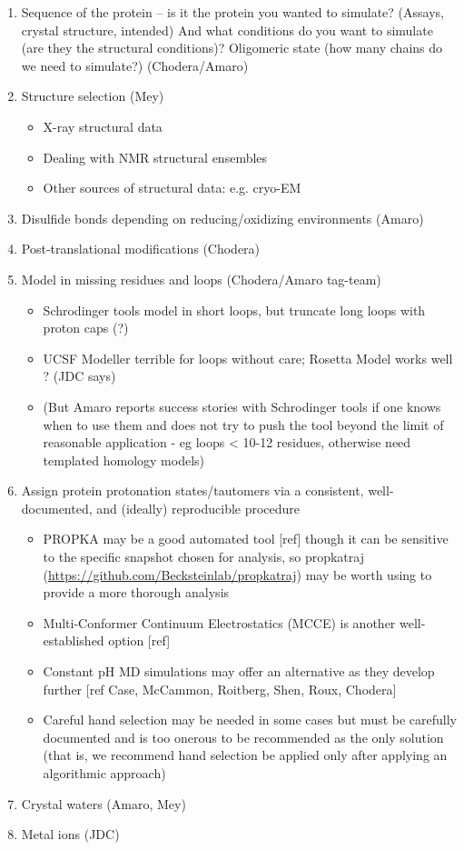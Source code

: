\documentclass[9pt,bestpractices]{livecoms}
\begin{document}
\begin{enumerate}
\item Sequence of the protein -- is it the protein you wanted to simulate? (Assays, crystal structure, intended) And what conditions do you want to simulate (are they the structural conditions)? Oligomeric state (how many chains do we need to simulate?) (Chodera/Amaro)
\item Structure selection (Mey) 
    \begin{itemize}
    \item  X-ray structural data
    \item Dealing with NMR structural ensembles
    \item Other sources of structural data: e.g. cryo-EM
    \end{itemize}
\item Disulfide bonds depending on reducing/oxidizing environments (Amaro)
\item Post-translational modifications (Chodera)
\item Model in missing residues and loops (Chodera/Amaro tag-team)
    \begin{itemize}
    \item Schrodinger tools model in short loops, but truncate long loops with proton caps (?)
    \item UCSF Modeller terrible for loops without care; Rosetta Model works well ? (JDC says)
    \item (But Amaro reports success stories with Schrodinger tools if one knows when to use them and does not try to push the tool beyond the limit of reasonable application - eg loops < 10-12 residues, otherwise need templated homology models)
    \end{itemize}
\item Assign protein protonation states/tautomers via a consistent, well-documented, and (ideally) reproducible procedure 
    \begin{itemize}
    \item PROPKA may be a good automated tool [ref] though it can be sensitive to the specific snapshot chosen for analysis, so propkatraj (\url{https://github.com/Becksteinlab/propkatraj}) may be worth using to provide a more thorough analysis
    \item Multi-Conformer Continuum Electrostatics (MCCE) is another well-established option [ref] 
    \item Constant pH MD simulations may offer an alternative as they develop further [ref  Case, McCammon, Roitberg, Shen, Roux, Chodera]
    \item Careful hand selection may be needed in some cases but must be carefully documented and is too onerous to be recommended as the only solution (that is, we recommend hand selection be applied only after applying an algorithmic approach)
    \end{itemize}
\item Crystal waters (Amaro, Mey)
\item Metal ions (JDC)


\end{enumerate}
\end{document}
